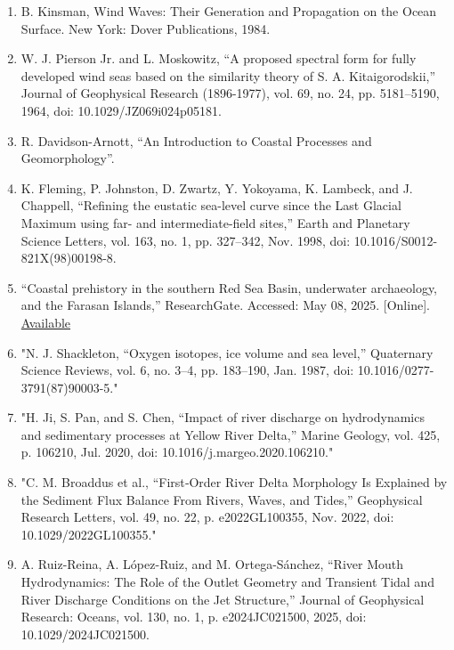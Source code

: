 \documentclass{article}
\begin{document}
{\begin{enumerate}
    \item {B. Kinsman, Wind Waves: Their Generation and Propagation on the Ocean Surface. New York: Dover Publications, 1984.}

    \item {W. J. Pierson Jr. and L. Moskowitz, “A proposed spectral form for fully developed wind seas based on the similarity theory of S. A. Kitaigorodskii,” Journal of Geophysical Research (1896-1977), vol. 69, no. 24, pp. 5181–5190, 1964, doi: 10.1029/JZ069i024p05181.}

    \item {R. Davidson-Arnott, “An Introduction to Coastal Processes and Geomorphology”.}

    \item {K. Fleming, P. Johnston, D. Zwartz, Y. Yokoyama, K. Lambeck, and J. Chappell, “Refining the eustatic sea-level curve since the Last Glacial Maximum using far- and intermediate-field sites,” Earth and Planetary Science Letters, vol. 163, no. 1, pp. 327–342, Nov. 1998, doi: 10.1016/S0012-821X(98)00198-8.}

    \item {“Coastal prehistory in the southern Red Sea Basin, underwater archaeology, and the Farasan Islands,” ResearchGate. Accessed: May 08, 2025. [Online]. \href{https://www.researchgate.net/publication/277182725_Coastal_prehistory_in_the_southern_Red_Sea_Basin_underwater_archaeology_and_the_Farasan_Islands}{Available}}

    \item {"N. J. Shackleton, “Oxygen isotopes, ice volume and sea level,” Quaternary Science Reviews, vol. 6, no. 3–4, pp. 183–190, Jan. 1987, doi: 10.1016/0277-3791(87)90003-5."}

    \item {"H. Ji, S. Pan, and S. Chen, “Impact of river discharge on hydrodynamics and sedimentary processes at Yellow River Delta,” Marine Geology, vol. 425, p. 106210, Jul. 2020, doi: 10.1016/j.margeo.2020.106210."}

    \item{"C. M. Broaddus et al., “First‐Order River Delta Morphology Is Explained by the Sediment Flux Balance From Rivers, Waves, and Tides,” Geophysical Research Letters, vol. 49, no. 22, p. e2022GL100355, Nov. 2022, doi: 10.1029/2022GL100355."}

    \item{A. Ruiz-Reina, A. López-Ruiz, and M. Ortega-Sánchez, “River Mouth Hydrodynamics: The Role of the Outlet Geometry and Transient Tidal and River Discharge Conditions on the Jet Structure,” Journal of Geophysical Research: Oceans, vol. 130, no. 1, p. e2024JC021500, 2025, doi: 10.1029/2024JC021500.}


\end{enumerate}}
\end{document}
